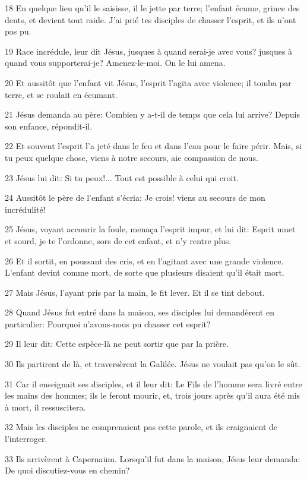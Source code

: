 \par 18 En quelque lieu qu'il le saisisse, il le jette par terre; l'enfant écume, grince des dents, et devient tout raide. J'ai prié tes disciples de chasser l'esprit, et ils n'ont pas pu.
\par 19 Race incrédule, leur dit Jésus, jusques à quand serai-je avec vous? jusques à quand vous supporterai-je? Amenez-le-moi. On le lui amena.
\par 20 Et aussitôt que l'enfant vit Jésus, l'esprit l'agita avec violence; il tomba par terre, et se roulait en écumant.
\par 21 Jésus demanda au père: Combien y a-t-il de temps que cela lui arrive? Depuis son enfance, répondit-il.
\par 22 Et souvent l'esprit l'a jeté dans le feu et dans l'eau pour le faire périr. Mais, si tu peux quelque chose, viens à notre secours, aie compassion de nous.
\par 23 Jésus lui dit: Si tu peux!... Tout est possible à celui qui croit.
\par 24 Aussitôt le père de l'enfant s'écria: Je crois! viens au secours de mon incrédulité!
\par 25 Jésus, voyant accourir la foule, menaça l'esprit impur, et lui dit: Esprit muet et sourd, je te l'ordonne, sors de cet enfant, et n'y rentre plus.
\par 26 Et il sortit, en poussant des cris, et en l'agitant avec une grande violence. L'enfant devint comme mort, de sorte que plusieurs disaient qu'il était mort.
\par 27 Mais Jésus, l'ayant pris par la main, le fit lever. Et il se tint debout.
\par 28 Quand Jésus fut entré dans la maison, ses disciples lui demandèrent en particulier: Pourquoi n'avons-nous pu chasser cet esprit?
\par 29 Il leur dit: Cette espèce-là ne peut sortir que par la prière.
\par 30 Ils partirent de là, et traversèrent la Galilée. Jésus ne voulait pas qu'on le sût.
\par 31 Car il enseignait ses disciples, et il leur dit: Le Fils de l'homme sera livré entre les mains des hommes; ils le feront mourir, et, trois jours après qu'il aura été mis à mort, il ressuscitera.
\par 32 Mais les disciples ne comprenaient pas cette parole, et ils craignaient de l'interroger.
\par 33 Ils arrivèrent à Capernaüm. Lorsqu'il fut dans la maison, Jésus leur demanda: De quoi discutiez-vous en chemin?
